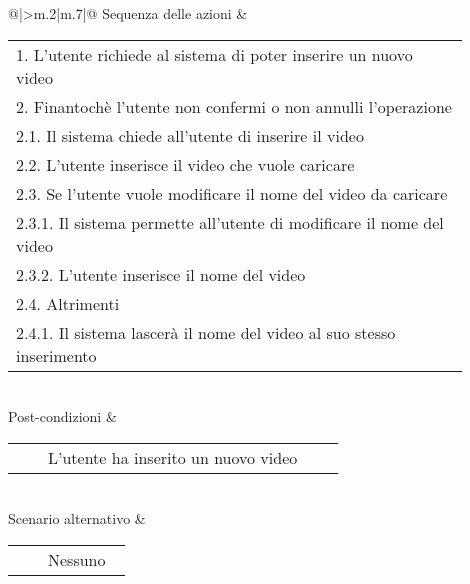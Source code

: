 \begin{longtable}{@{}|>{\centering\arraybackslash}m{.2\textwidth}|m{.7\textwidth}|@{}}
		Sequenza delle azioni & \begin{tabular}{m{0.9\linewidth}}\hspace{0.0cm}1. L'utente richiede al sistema di poter inserire un nuovo video\\\hspace{0.0cm}2. Finantochè l'utente non confermi o non annulli l'operazione\\\hspace{0.5cm}\hspace{0.0cm}2.1. Il sistema chiede all'utente di inserire il video\\\hspace{0.5cm}\hspace{0.0cm}2.2. L'utente inserisce il video che vuole caricare\\\hspace{0.5cm}\hspace{0.0cm}2.3. Se l'utente vuole modificare il nome del video da caricare\\\hspace{1.0cm}\hspace{0.5cm}\hspace{0.0cm}2.3.1. Il sistema permette all'utente di modificare il nome del video\\\hspace{1.0cm}\hspace{0.5cm}\hspace{0.0cm}2.3.2. L'utente inserisce il nome del video\\\hspace{0.5cm}\hspace{0.0cm}2.4. Altrimenti\\\hspace{1.0cm}\hspace{0.5cm}\hspace{0.0cm}2.4.1. Il sistema lascerà il nome del video al suo stesso inserimento\\\end{tabular}\\
		Post-condizioni & \begin{tabular}{m{0.9\linewidth}}~~\llap{\textbullet}~~L'utente ha inserito un nuovo video\\\end{tabular}\\
		Scenario alternativo & \begin{tabular}{m{0.9\linewidth}}~~\llap{\textbullet}~~Nessuno\\\end{tabular}\\\hline
		
	\end{longtable}

